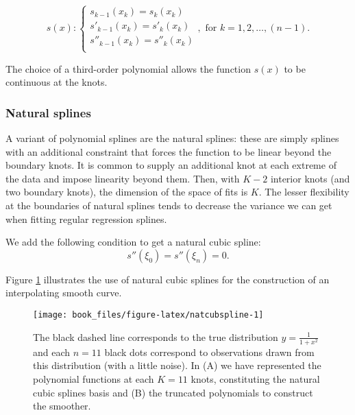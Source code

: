\documentclass[]{book}
\begin{document}
\[s(x): \left\{
    \begin{array}{ll}
        s_{k-1}(x_k) = s_k(x_k)  \\
        s'_{k-1}(x_k) = s'_k(x_k) \\
        s''_{k-1}(x_k) = s''_k(x_k) \\
    \end{array}
\right.
 ,\text{ for } k = 1,2,\dots,(n-1).\]

The choice of a third-order polynomial allows the function \(s(x)\) to be
continuous at the knots.

\hypertarget{natural-splines}{%
\subsubsection*{Natural splines}\label{natural-splines}}

A variant of polynomial splines are the natural splines: these are
simply splines with an additional constraint that forces the function to
be linear beyond the boundary knots. It is common to supply an
additional knot at each extreme of the data and impose linearity beyond
them. Then, with \(K-2\) interior knots (and two boundary knots), the
dimension of the space of fits is \(K\). The lesser flexibility at the
boundaries of natural splines tends to decrease the variance we can get
when fitting regular regression splines.

We add the following condition to get a natural cubic spline:
\[s''(\xi_0) = s''(\xi_n) = 0.\]

Figure \ref{fig:natcubspline} illustrates the use of natural cubic splines
for the construction of an interpolating smooth curve.



\begin{figure}

{\centering \texttt{[image: book\_files/figure-latex/natcubspline-1]} 

}

\caption{The black dashed line corresponds to the true distribution \(y = \frac{1}{1+x^2}\) and each \(n = 11\) black dots correspond to observations drawn from this distribution (with a little noise). In (A) we have represented the polynomial functions at each \(K = 11\) knots, constituting the natural cubic splines basis and (B) the truncated polynomials to construct the smoother.}\label{fig:natcubspline}
\end{figure}
\end{document}
